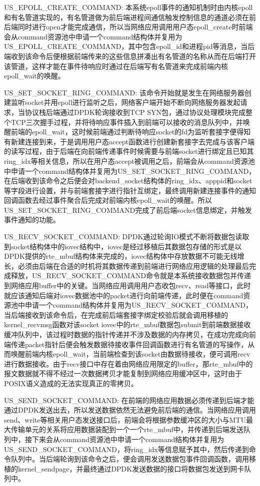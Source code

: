 US\_EPOLL\_CREATE\_COMMAND: 本系统epoll事件的通知机制时由内核epoll和有名管道实现的，有名管道做为前后端进程间通信触发控制信息的通道必须在前后端同时进行open才能完成通信，所以当网络应用调用用户态epoll\_create时前端会从command资源池中申请一个command结构体并复用为US\_EPOLL\_CREATE\_COMMAND，其中包含epoll\_id和进程pid等消息，当后端收到该命令后便根据前端传来的这些信息拼凑出有名管道的名称从而在后端打开该管道，这样才能在事件待响应时通过在后端写有名管道来完成前端内核epoll\_wait的唤醒。

US\_SET\_SOCKET\_RING\_COMMAND: 该命令开始就是发生在网络服务器创建监听socket并用epoll进行监听之后，网络客户端开始不断向网络服务器发起请求，当协议栈后端通过DPDK轮询接收到TCP SYN包，通过协议处理模块完成整个TCP三次握手过程，并将待响应事件插入到前端可以接收的消息队列中，并唤醒前端的epoll\_wait，这时候前端通过判断待响应socket的fd为监听套接字便得知有新建连接到来，于是调用用户态accept函数进行创建新套接字去完成与该客户端的读写过程，由于后端在向前端传递事件时候需要与前端socket进行绑定且已知其ring\_idx等相关信息，所以在用户态accept被调用之后，前端会从command资源池中申请一个command结构体并复用为US\_SET\_SOCKET\_RING\_COMMAND，在后端收到该命令之后便会对backend\_socket结构体的ring\_idx、apppid和socket等字段进行设置，并与前端套接字进行指针互绑定，最终调用新建连接事件的通知回调函数去经过事件聚合后完成对前端内核epoll\_wait的唤醒。所以US\_SET\_SOCKET\_RING\_COMMAND完成了前后端socket信息绑定，并触发事件通知的功能。

US\_RECV\_SOCKET\_COMMAND: DPDK通过轮询IO模式不断将数据包读取到socket结构体中的iovec结构中，iovec是经过移植后其数据包存储的形式是以DPDK提供的rte\_mbuf结构体来完成的，iovec结构体中存放数据不可能无线增长，必须由后端在合适的时机将其数据传递到前端进行网络应用逻辑的处理最后完成释放，US\_RECV\_SOCKET\_COMMAND命令就是本系统接收数据包并传递到网络应用buffer中的关键。当网络应用调用用户态收包recv、read等接口，此时就应该通知后端对iovec数据池中的packet进行向前端传递，此时便在command资源池中申请一个command结构体并复用为US\_RECV\_SOCKET\_COMMAND，当后端接收到该命令后，在完成前后端套接字绑定校验后就会调用移植的kernel\_recvmsg函数对该socket iovec中的rte\_mbuf数据包submit到前端数据接收缓冲队列中，该过程时数据的指针传递并不涉及数据的内存拷贝，在成功完成向前端传递packet指针后便会触发数据待接收事件回调函数进行有名管道的写操作，从而唤醒前端内核epoll\_wait，当前端检查到该socket由数据待接收，便可调用recv进行数据接收。由于recv接口中存在着由网络应用限定的buffer，那rte\_mbuf中的报文数据就不得不经过一次数据拷贝才能复制到网络应用缓冲区中，这时由于POSIX语义造成的无法实现真正的零拷贝。


US\_SEND\_SOCKET\_COMMAND: 在前端的网络应用数据必须传递到后端才能通过DPDK发送出去，所以发送数据依然无法避免前后端的通信。当网络应用调用send、write等相关用户态发送接口后，前端会将根据参数缓冲区的大小与MTU最大传输单元的关系将应用数据装配到一个一个rte\_mbuf中，并传递到后端发送队列中，接下来会从command资源池中申请一个command结构体并复用为US\_SEND\_SOCKET\_COMMAND，将ring\_idx等信息赋予其中，然后传递到命令队列中。当后端轮询到该命令之后，便会调用发送数据包事件回调函数，调用移植的kernel\_sendpage，并最终通过DPDK发送数据的接口将数据包发送到网卡队列中。

